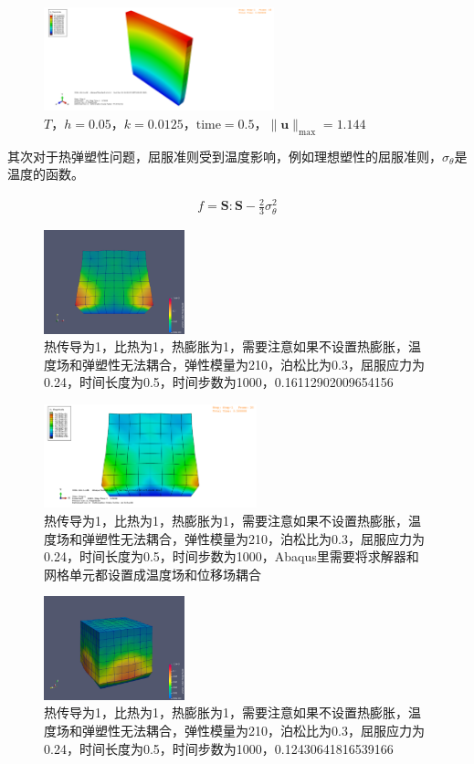 \begin{figure}[!htbp]
  \centering
  \includegraphics[height=3cm]{fig/4/3.10.5:8.png}
  \caption{$T$，$h=0.05$，$k=0.0125$，$\mathrm{time}=0.5$，$\|\mathbf u\|_{\max}=1.144$}
  \label{fig:4.1.4:4}
\end{figure}


其次对于热弹塑性问题，屈服准则受到温度影响，例如理想塑性的屈服准则，$\sigma_\theta$是温度的函数。

\begin{align*}	   
  f = \mathbf S:\mathbf S-\frac{2}{3}\sigma^2_\theta
\end{align*}

\begin{figure}[!htbp]
  \centering
  \includegraphics[height=3cm]{fig/4/4.1.6/4.1.6.3.png}
  \caption{热传导为1，比热为1，热膨胀为1，需要注意如果不设置热膨胀，温度场和弹塑性无法耦合，弹性模量为210，泊松比为0.3，屈服应力为0.24，时间长度为0.5，时间步数为1000，0.16112902009654156}
  \label{fig:4.1.4:4}
\end{figure}

\begin{figure}[!htbp]
  \centering
  \includegraphics[height=3cm]{fig/4/4.1.6/4.1.6.4.png}
  \caption{热传导为1，比热为1，热膨胀为1，需要注意如果不设置热膨胀，温度场和弹塑性无法耦合，弹性模量为210，泊松比为0.3，屈服应力为0.24，时间长度为0.5，时间步数为1000，Abaqus里需要将求解器和网格单元都设置成温度场和位移场耦合}
  \label{fig:4.1.4:4}
\end{figure}

\begin{figure}[!htbp]
  \centering
  \includegraphics[height=3cm]{fig/4/4.1.6/4.1.6.1.png}
  \caption{热传导为1，比热为1，热膨胀为1，需要注意如果不设置热膨胀，温度场和弹塑性无法耦合，弹性模量为210，泊松比为0.3，屈服应力为0.24，时间长度为0.5，时间步数为1000，0.12430641816539166}
  \label{fig:4.1.4:4}
\end{figure}


